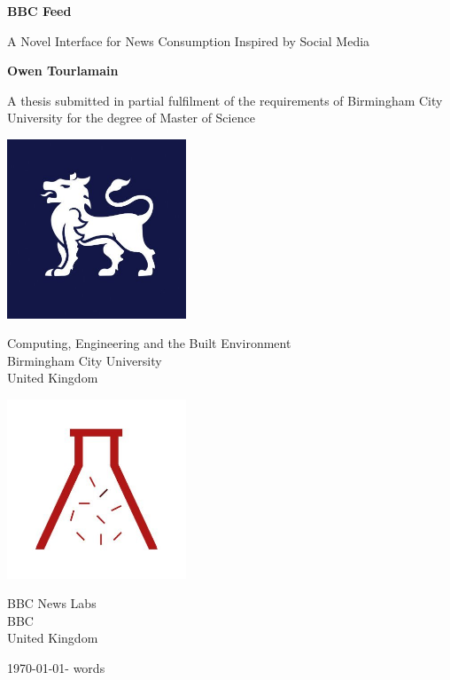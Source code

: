 \documentclass[12pt,titlepage]{article}
\newcommand\wordcount{}
\begin{document}
\begin{titlepage}
	\begin{center}
		\vspace*{1cm}

		\begingroup
      \fontsize{24}{30}\selectfont
      \textbf{BBC Feed}
    \endgroup

    \begingroup
      \fontsize{18}{22}\selectfont
      A Novel Interface for News Consumption Inspired by Social Media
    \endgroup

		\vspace{2cm}

		\textbf{Owen Tourlamain}

		\vfill

		A thesis submitted in partial fulfilment of the requirements of Birmingham City University for the degree of Master of Science

		\vspace{0.8cm}

    \begin{multicols}{2}

		\includegraphics[width=0.4\textwidth]{../img/bcu.jpg}

		Computing, Engineering and the Built Environment\\
		Birmingham City University\\
		United Kingdom\\
    \columnbreak

    \includegraphics[width=0.4\textwidth]{../img/bbcnl.jpg}

		BBC News Labs\\
		BBC\\
		United Kingdom\\

    \end{multicols}

    \today - \wordcount words

	\end{center}
\end{titlepage}
\end{document}

